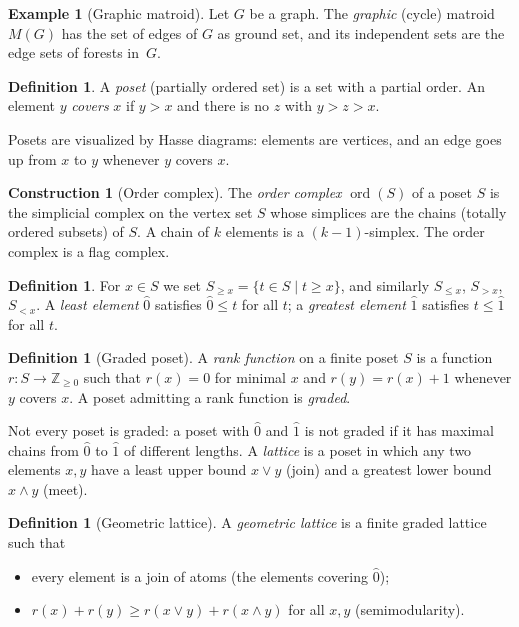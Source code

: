 \documentclass[11pt,a4paper]{article}
\numberwithin{equation}{section}
\theoremstyle{plain}
\theoremstyle{definition}
\newtheorem{definition}[theorem]{Definition}
\newtheorem{construction}[theorem]{Construction}
\newtheorem{example}[theorem]{Example}
\theoremstyle{remark}
\newcommand{\Z}{\mathbb{Z}}
\DeclareMathOperator{\ord}{ord}
\begin{document}
\begin{example}[Graphic matroid]\label{ex:graphic}
Let $G$ be a graph. The \emph{graphic} (cycle) matroid $M(G)$ has the set of edges of $G$ as ground set, and its independent sets are the edge sets of forests in~$G$.
\end{example}

\begin{definition}
A \emph{poset} (partially ordered set) is a set with a partial order. An element $y$ \emph{covers} $x$ if $y>x$ and there is no $z$ with $y>z>x$.
\end{definition}

Posets are visualized by Hasse diagrams: elements are vertices, and an edge goes up from $x$ to $y$ whenever $y$ covers $x$.

\begin{construction}[Order complex]
The \emph{order complex} $\ord(S)$ of a poset $S$ is the simplicial complex on the vertex set $S$ whose simplices are the chains (totally ordered subsets) of $S$. A chain of $k$ elements is a $(k-1)$-simplex. The order complex is a flag complex.
\end{construction}

\begin{definition}
For $x\in S$ we set $S_{\geqslant x}=\{t\in S\mid t\geqslant x\}$, and similarly $S_{\leqslant x}$, $S_{>x}$, $S_{<x}$. A \emph{least element} $\hat0$ satisfies $\hat0\leqslant t$ for all $t$; a \emph{greatest element} $\hat1$ satisfies $t\leqslant\hat1$ for all $t$.
\end{definition}

\begin{definition}[Graded poset]
A \emph{rank function} on a finite poset $S$ is a function $r\colon S\to\Z_{\geqslant0}$ such that $r(x)=0$ for minimal $x$ and $r(y)=r(x)+1$ whenever $y$ covers $x$. A poset admitting a rank function is \emph{graded}.
\end{definition}

Not every poset is graded: a poset with $\hat0$ and $\hat1$ is not graded if it has maximal chains from $\hat0$ to $\hat1$ of different lengths. A \emph{lattice} is a poset in which any two elements $x,y$ have a least upper bound $x\vee y$ (join) and a greatest lower bound $x\wedge y$ (meet).

\begin{definition}[Geometric lattice]
A \emph{geometric lattice} is a finite graded lattice such that
\begin{itemize}[nosep]
\item every element is a join of atoms (the elements covering $\hat0$);
\item $r(x)+r(y)\geqslant r(x\vee y)+r(x\wedge y)$ for all $x,y$ (semimodularity).
\end{itemize}
\end{definition}
\end{document}
